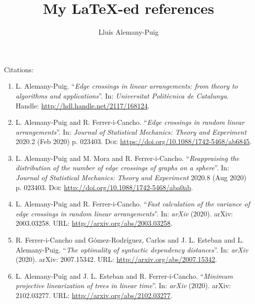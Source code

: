 \documentclass[12pt]{article}
\begin{document}
\title{My \LaTeX-ed references}
\author{
	Llu\'is Alemany-Puig
}

\maketitle

Citations:
\begin{enumerate}
	\item[\cite{Alemany2019a}] L. Alemany-Puig. ``{\em Edge crossings in linear arrangements: from theory to algorithms and applications}''. In: {\em Universitat Politècnica de Catalunya}. Handle: \url{http://hdl.handle.net/2117/168124}.
	
	\item[\cite{Alemany2020a}] L. Alemany-Puig and R. Ferrer-i-Cancho. ``{\em Edge crossings in random linear arrangements}''. In: {\em Journal of Statistical Mechanics: Theory and Experiment} 2020.2 (Feb 2020) p. 023403. \textsc{Doi}: \url{https://doi.org/10.1088/1742-5468/ab6845}.

	\item[\cite{Alemany2020b}] L. Alemany-Puig and M. Mora and R. Ferrer-i-Cancho. ``{\em Reappraising the distribution of the number of edge crossings of graphs on a sphere}''. In: {\em Journal of Statistical Mechanics: Theory and Experiment} 2020.8 (Aug 2020) p. 023403. \textsc{Doi}: \url{http://doi.org/10.1088/1742-5468/aba0ab}.

	\item[\cite{Alemany2020c}] L. Alemany-Puig and R. Ferrer-i-Cancho. ``{\em Fast calculation of the variance of edge crossings in random linear arrangements}''. In: {\em arXiv} (2020). arXiv: 2003.03258. URL: \url{http://arxiv.org/abs/2003.03258}.
	
	\item[\cite{Ferrer2020a}] R. Ferrer-i-Cancho and G{\'{o}}mez-Rodr{\'{i}}guez, Carlos and J. L. Esteban and L. Alemany-Puig. ``{\em The optimality of syntactic dependency distances}''. In: {\em arXiv} (2020). arXiv: 2007.15342. URL: \url{http://arxiv.org/abs/2007.15342}.
	
	\item[\cite{Ferrer2020a}] L. Alemany-Puig and J. L. Esteban and R. Ferrer-i-Cancho. ``{\em Minimum projective linearization of trees in linear time}''. In: {\em arXiv} (2020). arXiv: 2102.03277. URL: \url{http://arxiv.org/abs/2102.03277}.
	
\end{enumerate}

\printbibliography
\end{document}
